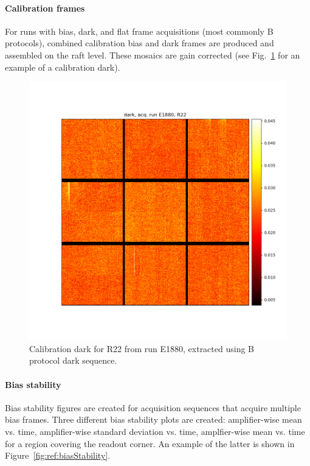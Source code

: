 \paragraph{Calibration frames}

For runs with bias, dark, and flat frame acquisitions (most commonly B protocols), combined calibration bias and dark frames are produced and assembled on the raft level. These mosaics are gain corrected (see Fig.~\ref{fig:ref:calibFrame} for an example of a calibration dark).

\begin{figure}[ht]
    \centering
    \includegraphics[width=0.8\linewidth]{figures/ReferenceFigures/eoDarkRaftMosaic_LSSTCam_R22_S00_u_lsstccs_eo_raft_calib_mosaics_E1880_w_2024_35_20241101T020324Z.png}
    \caption{Calibration dark for R22 from run E1880, extracted using B protocol dark sequence.}
    \label{fig:ref:calibFrame}
\end{figure}
\clearpage
\paragraph{Bias stability}

Bias stability figures are created for acquisition sequences that acquire multiple bias frames. Three different bias stability plots are created: amplifier-wise mean vs. time, amplifier-wise standard deviation vs. time, amplfier-wise mean vs. time for a region covering the readout corner.  An example of the latter is shown in Figure~\ref{fig:ref:biasStability}.

